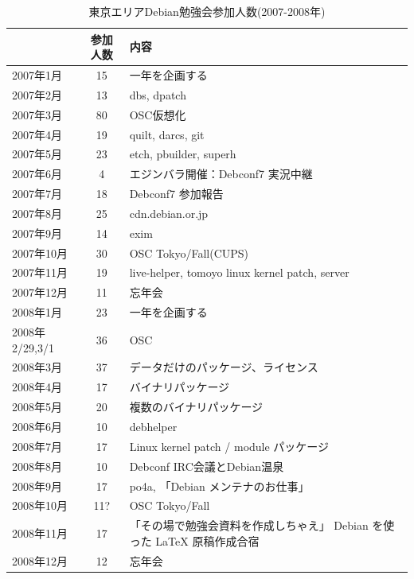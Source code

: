 \documentclass[mingoth,a4paper]{jsarticle}
\begin{document}
\begin{table}[ht]
\begin{minipage}{0.5\hsize}
 \caption{東京エリアDebian勉強会参加人数(2007-2008年)}\label{tab:count2007}
 \begin{center}
  \begin{tabular}{|l|c|p{10em}|}
 \hline
 & 参加人数 & 内容\\
 \hline
   2007年1月 & 15 & 一年を企画する \\
   2007年2月 & 13 & dbs, dpatch\\
   2007年3月 & 80 & OSC仮想化 \\
   2007年4月 & 19 & quilt, darcs, git\\
   2007年5月 & 23 & etch, pbuilder, superh \\
   2007年6月 & 4 & エジンバラ開催：Debconf7 実況中継 \\
   2007年7月 & 18 & Debconf7 参加報告\\
   2007年8月 & 25 & cdn.debian.or.jp \\
   2007年9月 & 14 & exim \\
   2007年10月 & 30 & OSC Tokyo/Fall(CUPS) \\
   2007年11月 & 19 & live-helper, tomoyo linux kernel patch, server\\
   2007年12月 & 11 & 忘年会\\
   2008年1月 & 23 & 一年を企画する \\
   2008年2/29,3/1 & 36 & OSC  \\
   2008年3月 & 37 & データだけのパッケージ、ライセンス \\
   2008年4月 & 17 & バイナリパッケージ \\
   2008年5月 & 20 & 複数のバイナリパッケージ \\
   2008年6月 & 10 & debhelper \\
   2008年7月 & 17 & Linux kernel patch / module パッケージ \\
   2008年8月 & 10 & Debconf IRC会議とDebian温泉 \\
   2008年9月 & 17 & po4a, 「Debian メンテナのお仕事」 \\
   2008年10月 & 11? & OSC Tokyo/Fall \\
   2008年11月 & 17 & 「その場で勉強会資料を作成しちゃえ」 Debian を使った \LaTeX{} 原稿作成合宿 \\
   2008年12月 & 12 & 忘年会 \\
 \hline
  \end{tabular}
 \end{center}
\end{minipage}
\end{table}
\end{document}
